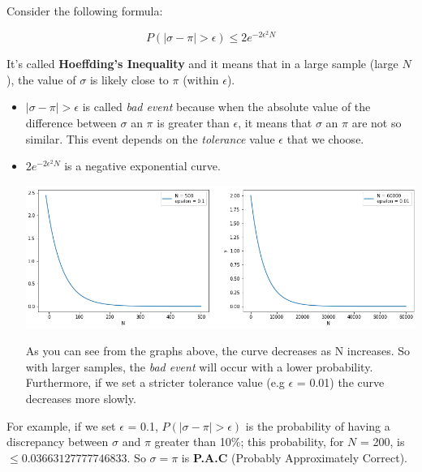 Consider the following formula:
\begin{center}
    \[P(|\sigma - \pi| > \epsilon) \leq 2e^{-2\epsilon^{2}N}\]
\end{center}
It's called \textbf{Hoeffding's Inequality} and it means that in a large sample (large $N$), the value of $\sigma$ is likely close to $\pi$ (within $\epsilon$).
\begin{itemize}
    \item $|\sigma - \pi| > \epsilon$ is called \textit{bad event} because when the absolute value of the difference between $\sigma$ an $\pi$ is greater than $\epsilon$, it means that $\sigma$ an $\pi$ are not so similar. This event depends on the \textit{tolerance} value $\epsilon$ that we choose.
    
    \item $2e^{-2\epsilon^{2}N}$ is a negative exponential curve.
    \begin{flushleft}
        \includegraphics[scale = 0.45]{images/exp.png}
    \end{flushleft}
    As you can see from the graphs above, the curve decreases as N increases. So with larger samples, the \textit{bad event} will occur with a lower probability. Furthermore, if we set a stricter tolerance value (e.g $\epsilon$ = 0.01) the curve decreases more slowly.
\end{itemize}
For example, if we set $\epsilon$ = 0.1, $P(|\sigma - \pi| > \epsilon)$ is the probability of having a discrepancy between $\sigma$ and $\pi$ greater than 10\%; this probability, for $N$ = 200, is $\leq 0.03663127777746833$. So $\sigma = \pi$ is \textbf{P.A.C} (Probably Approximately Correct).

